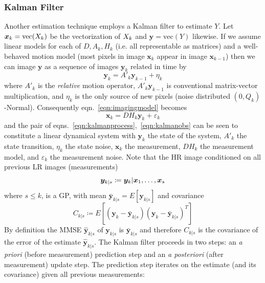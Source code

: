 \subsubsection{Kalman Filter}
Another estimation technique employs a Kalman filter\cite{elad1999} to estimate $Y$.
%
Let $\bm{x}_k = \text{vec}(X_k)$ be the vectorization of $X_k$ and $\bm{y} = \text{vec}(Y)$ likewise.
%
If we assume linear models for each of $D, A_k, H_k$ (i.e. all representable as matrices) and a well-behaved motion model (most pixels in image $\bm{x}_k$ appear in image $\bm{x}_{k-1}$) then we can image $\bm{y}$ as a sequence of images $\bm{y}_k$ related in time by
\begin{equation}
    \bm{y}_k = A'_k \bm{y}_{k-1} + \eta_k
    \label{eqn:kalmanprocess}
\end{equation}
%
where $A'_k$ is the \textit{relative} motion operator, $A'_k\bm{y}_{k-1}$ is conventional matrix-vector multiplication, and $\eta_k$ is the only source of new pixels (noise distributed $(0, Q_k)$-Normal).
%
Consequently eqn.~\eqref{eqn:imagingmodel} becomes
\begin{equation}
    \bm{x}_k = DH_k\bm{y}_k + \varepsilon_k
    \label{eqn:kalmanobs}
\end{equation}
and the pair of eqns.~\ref{eqn:kalmanprocess},~\ref{eqn:kalmanobs} can be seen to constitute a linear dynamical system with $\bm{y}_k$ the state of the system, $A'_k$ the state transition, $\eta_k$ the state noise, $\bm{x}_k$ the measurement, $DH_k$ the measurement model, and $\varepsilon_k$ the measurement noise.
%
Note that the HR image conditioned on all previous LR images (measurements)
\begin{equation}
    \bm{y}_{k|s} \coloneqq \bm{y}_k|\bm{x}_1, \mathellipsis, \bm{x}_s
\end{equation}
where $s \leq k$, is a GP, with mean $\bar{\bm{y}}_{k|s} = E\left[\bm{y}_{k|s}\right]$
and covariance
\begin{equation}
    C_{k|s} \coloneqq E\left[ (\bm{y}_k - \bar{\bm{y}}_{k|s})(\bm{y}_k - \bar{\bm{y}}_{k|s})^T  \right]
\end{equation}
%
By definition the MMSE $\hat{\bm{y}}_{k|s}$ of $\bm{y}_{k|s}$ is $\bar{\bm{y}}_{k|s}$ and therefore $C_{k|s}$ is the covariance of the error of the estimate $\hat{\bm{y}}_{k|s}$.
%
The Kalman filter proceeds in two steps: an \textit{a priori} (before measurement) prediction step and an \textit{a posteriori} (after measurement) update step.
%
The prediction step iterates on the estimate (and its covariance) given all previous measurements:
